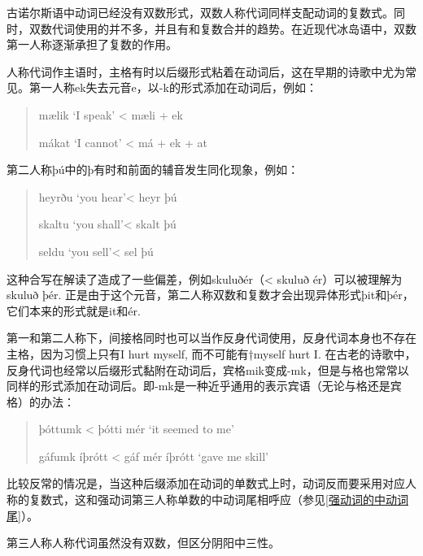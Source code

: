 古诺尔斯语中动词已经没有双数形式，双数人称代词同样支配动词的复数式。同时，双数代词使用的并不多，并且有和复数合并的趋势。在近现代冰岛语中，双数第一人称逐渐承担了复数的作用。

人称代词作主语时，主格有时以后缀形式粘着在动词后，这在早期的诗歌中尤为常见。第一人称ek失去元音e，以-k的形式添加在动词后，例如：

\begin{quote}
  mælik `I speak‌' \textless{} mæli + ek

  mákat `I cannot‌' \textless{} má + ek + at
\end{quote}

第二人称þú中的þ有时和前面的辅音发生同化现象，例如：

\begin{quote}
  heyrðu `you hear'\textless{} heyr þú

  skaltu `you shall'\textless{} skalt þú

  seldu `you sell'\textless{} sel þú
\end{quote}

这种合写在解读了造成了一些偏差，例如skuluðér（\textless{} skuluð
ér）可以被理解为skuluð þér.
正是由于这个元音，第二人称双数和复数才会出现异体形式þit和þér，它们本来的形式就是it和ér.

第一和第二人称下，间接格同时也可以当作反身代词使用，反身代词本身也不存在主格，因为习惯上只有I
hurt myself, 而不可能有†myself hurt I.
在古老的诗歌中，反身代词也经常以后缀形式黏附在动词后，宾格mik变成-mk，但是与格也常常以同样的形式添加在动词后。即-mk是一种近乎通用的表示宾语（无论与格还是宾格）的办法：

\begin{quote}
  þóttumk \textless{} þótti mér `it seemed to me‌'

  gáfumk íþrótt \textless{} gáf mér íþrótt `gave me skill'
\end{quote}

比较反常的情况是，当这种后缀添加在动词的单数式上时，动词反而要采用对应人称的复数式，这和强动词第三人称单数的中动词尾相呼应（参见\ref{强动词的中动词尾}）。

第三人称人称代词虽然没有双数，但区分阴阳中三性。

